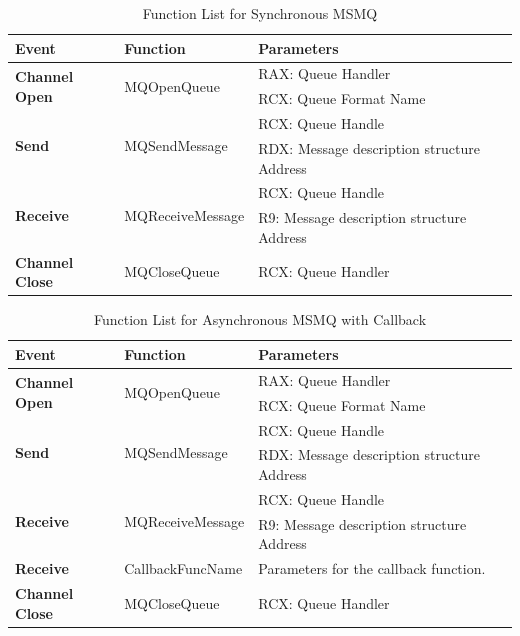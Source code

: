     \begin{table}[H]
        \centering
        \caption{Function List for Synchronous MSMQ}
        \label{msmqsynfunctions}
        \begin{tabular}{|l|l|l|}
            \hline
             \textbf{Event} & \textbf{Function}& \textbf{Parameters}  \\
             \hline
             \multirow{2}{*}{{\textbf{Channel Open}}}
             &\multirow{2}{*}{{MQOpenQueue}} &  RAX: Queue Handler\\
              \cline{3-3} 
             & &  RCX: Queue Format Name\\
            \hline
             \multirow{2}{*}{{\textbf{Send}}}
             &\multirow{2}{*}{MQSendMessage} &  RCX: Queue Handle \\
              \cline{3-3} 
             &&  RDX: Message description structure Address \\
            \hline
             \multirow{2}{*}{{\textbf{Receive}}}
             & \multirow{2}{*}{MQReceiveMessage}&  RCX: Queue Handle \\
              \cline{3-3} 
              &&  R9: Message description structure Address \\
            \hline
            \textbf{Channel Close} &MQCloseQueue & RCX: Queue Handler \\
            \hline
        \end{tabular}
    \end{table}


    \begin{table}[H]
        \centering
        \caption{Function List for Asynchronous MSMQ with Callback}
        \label{msmqasynfunctionscallback}
        \begin{tabular}{|l|l|l|}
            \hline
             \textbf{Event} & \textbf{Function}& \textbf{Parameters}  \\
             \hline
             \multirow{2}{*}{{\textbf{Channel Open}}}
             &\multirow{2}{*}{{MQOpenQueue}} &  RAX: Queue Handler\\
              \cline{3-3} 
             & &  RCX: Queue Format Name\\
            \hline
             \multirow{2}{*}{\textbf{Send}}
             &\multirow{2}{*}{MQSendMessage} &  RCX: Queue Handle \\
              \cline{3-3} 
             &&  RDX: Message description structure Address \\
            \hline
             \multirow{2}{*}{\textbf{Receive}}
             & \multirow{2}{*}{MQReceiveMessage}&  RCX: Queue Handle \\
              \cline{3-3} 
              &&  R9: Message description structure Address \\
             \hline
             \textbf{Receive}
              &CallbackFuncName&  Parameters for the callback function. \\
            \hline
            \textbf{Channel Close} &MQCloseQueue & RCX: Queue Handler \\
            \hline
        \end{tabular}
    \end{table}

